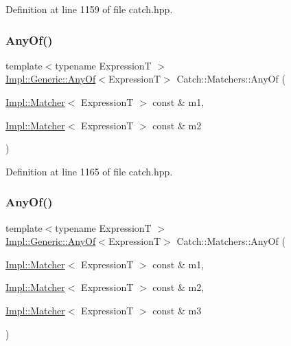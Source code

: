 Definition at line 1159 of file catch.\+hpp.

\hypertarget{namespace_catch_1_1_matchers_a9cb139c71b9e391d5fc017764695bf84}{}\label{namespace_catch_1_1_matchers_a9cb139c71b9e391d5fc017764695bf84} 
\subsubsection{\texorpdfstring{Any\+Of()}{AnyOf()}\hspace{0.1cm}{\footnotesize\ttfamily [1/2]}}
{\footnotesize\ttfamily template$<$typename ExpressionT $>$ \\
\hyperlink{class_catch_1_1_matchers_1_1_impl_1_1_generic_1_1_any_of}{Impl\+::\+Generic\+::\+Any\+Of}$<$ExpressionT$>$ Catch\+::\+Matchers\+::\+Any\+Of (\begin{DoxyParamCaption}\item[{\hyperlink{struct_catch_1_1_matchers_1_1_impl_1_1_matcher}{Impl\+::\+Matcher}$<$ ExpressionT $>$ const \&}]{m1,  }\item[{\hyperlink{struct_catch_1_1_matchers_1_1_impl_1_1_matcher}{Impl\+::\+Matcher}$<$ ExpressionT $>$ const \&}]{m2 }\end{DoxyParamCaption})\hspace{0.3cm}{\ttfamily [inline]}}



Definition at line 1165 of file catch.\+hpp.

\hypertarget{namespace_catch_1_1_matchers_a8efb0e533db973b8aff1172fb908db02}{}\label{namespace_catch_1_1_matchers_a8efb0e533db973b8aff1172fb908db02} 
\subsubsection{\texorpdfstring{Any\+Of()}{AnyOf()}\hspace{0.1cm}{\footnotesize\ttfamily [2/2]}}
{\footnotesize\ttfamily template$<$typename ExpressionT $>$ \\
\hyperlink{class_catch_1_1_matchers_1_1_impl_1_1_generic_1_1_any_of}{Impl\+::\+Generic\+::\+Any\+Of}$<$ExpressionT$>$ Catch\+::\+Matchers\+::\+Any\+Of (\begin{DoxyParamCaption}\item[{\hyperlink{struct_catch_1_1_matchers_1_1_impl_1_1_matcher}{Impl\+::\+Matcher}$<$ ExpressionT $>$ const \&}]{m1,  }\item[{\hyperlink{struct_catch_1_1_matchers_1_1_impl_1_1_matcher}{Impl\+::\+Matcher}$<$ ExpressionT $>$ const \&}]{m2,  }\item[{\hyperlink{struct_catch_1_1_matchers_1_1_impl_1_1_matcher}{Impl\+::\+Matcher}$<$ ExpressionT $>$ const \&}]{m3 }\end{DoxyParamCaption})\hspace{0.3cm}{\ttfamily [inline]}}



